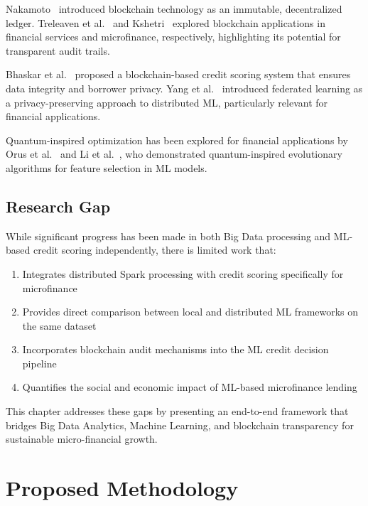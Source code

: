 \documentclass[runningheads]{llncs}
\begin{document}
Nakamoto~\cite{nakamoto2008bitcoin} introduced blockchain technology as an immutable, decentralized ledger. Treleaven et al.~\cite{treleaven2017blockchain} and Kshetri~\cite{kshetri2018blockchain} explored blockchain applications in financial services and microfinance, respectively, highlighting its potential for transparent audit trails.

Bhaskar et al.~\cite{bhaskar2021blockchain} proposed a blockchain-based credit scoring system that ensures data integrity and borrower privacy. Yang et al.~\cite{yang2019federated} introduced federated learning as a privacy-preserving approach to distributed ML, particularly relevant for financial applications.

Quantum-inspired optimization has been explored for financial applications by Orus et al.~\cite{orus2019quantum} and Li et al.~\cite{li2020quantum}, who demonstrated quantum-inspired evolutionary algorithms for feature selection in ML models.

\subsection{Research Gap}

While significant progress has been made in both Big Data processing and ML-based credit scoring independently, there is limited work that:
\begin{enumerate}
    \item Integrates distributed Spark processing with credit scoring specifically for microfinance
    \item Provides direct comparison between local and distributed ML frameworks on the same dataset
    \item Incorporates blockchain audit mechanisms into the ML credit decision pipeline
    \item Quantifies the social and economic impact of ML-based microfinance lending
\end{enumerate}

This chapter addresses these gaps by presenting an end-to-end framework that bridges Big Data Analytics, Machine Learning, and blockchain transparency for sustainable micro-financial growth.



\section{Proposed Methodology}
\label{sec:methodology}
\end{document}
